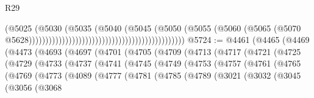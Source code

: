 \begin{lexlean}{R29}
\begin{coremodule}
                                                                              (@5025
                                                                                (@5030
                                                                                  (@5035
                                                                                    (@5040
                                                                                      (@5045
                                                                                        (@5050
                                                                                          (@5055
                                                                                            (@5060
                                                                                              (@5065
                                                                                                (@5070
                                                                                                  @5628)))))))))))))))))))))))))))))))))))))))))))))))
@5724 := @4461
    (@4465
      (@4469
        (@4473
          (@4693
            (@4697
              (@4701
                (@4705
                  (@4709
                    (@4713
                      (@4717
                        (@4721
                          (@4725
                            (@4729
                              (@4733
                                (@4737
                                  (@4741
                                    (@4745
                                      (@4749
                                        (@4753
                                          (@4757
                                            (@4761
                                              (@4765
                                                (@4769
                                                  (@4773
                                                    (@4089
                                                      (@4777
                                                        (@4781
                                                          (@4785
                                                            (@4789
                                                              (@3021
                                                                (@3032
                                                                  (@3045
                                                                    (@3056
                                                                      (@3068

\end{coremodule}
\end{lexlean}
